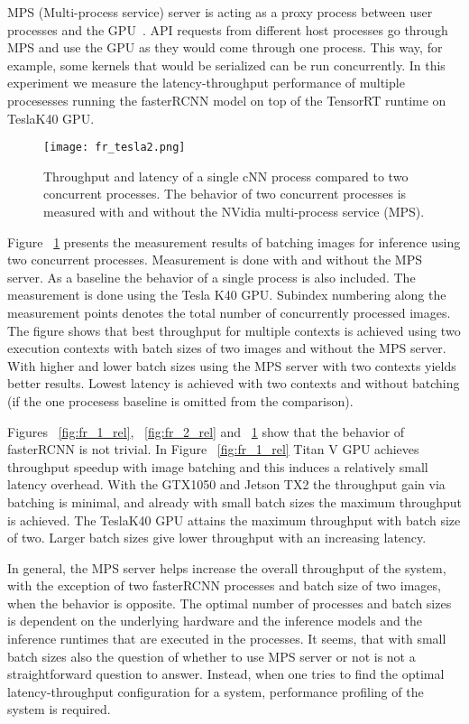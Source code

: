 \documentclass[sigconf]{acmart}
\begin{document}
MPS (Multi-process service) server is acting as a proxy process between user processes and the GPU~\cite{mps}. API requests from different host processes go through MPS and use the GPU as they would come through one process. This way, for example, some kernels that would be serialized can be run concurrently. In this experiment we measure the latency-throughput performance of multiple procesesses running the fasterRCNN model on top of the TensorRT runtime on TeslaK40 GPU. 

\begin{figure}[t]
\centering
\texttt{[image: fr\_tesla2.png]}
\caption{Throughput and latency of a single cNN process compared to two concurrent processes. The behavior of two concurrent processes is measured with and without the NVidia multi-process service (MPS).}
\label{fig:fr_tesla}
\end{figure}

Figure ~\ref{fig:fr_tesla} presents the measurement results of batching images for inference using two concurrent processes. Measurement is done with and without the MPS server. As a baseline the behavior of a single process is also included. The measurement is done using the Tesla K40 GPU. Subindex numbering along the measurement points denotes the total number of concurrently processed images. The figure shows that best throughput for multiple contexts is achieved using two execution contexts with batch sizes of two images and without the MPS server. With higher and lower batch sizes using the MPS server with two contexts yields better results. Lowest latency is achieved with two contexts and without batching (if the one procesess baseline is omitted from the comparison).

Figures ~\ref{fig:fr_1_rel}, ~\ref{fig:fr_2_rel} and ~\ref{fig:fr_tesla} show that the behavior of fasterRCNN is not trivial. In Figure ~\ref{fig:fr_1_rel} Titan V GPU achieves throughput speedup with image batching and this induces a relatively small latency overhead. With the GTX1050 and Jetson TX2 the throughput gain via batching is minimal, and already with small batch sizes the maximum throughput is achieved. The TeslaK40 GPU attains the maximum throughput with batch size of two. Larger batch sizes give lower throughput with an increasing latency.

In general, the MPS server helps increase the overall throughput of the system, with the exception of two fasterRCNN processes and batch size of two images, when the behavior is opposite. The optimal number of processes and batch sizes is dependent on the underlying hardware and the inference models and the inference runtimes that are executed in the processes. It seems, that with small batch sizes also the question of whether to use MPS server or not is not a straightforward question to answer. Instead, when one tries to find the optimal latency-throughput configuration for a system, performance profiling of the system is required.
\end{document}
